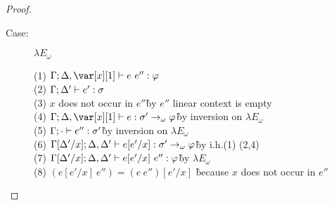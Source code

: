\begin{proof}
\begin{description}
\item[Case:] $\lambda E_\omega$
\begin{tabbing}
  (1) $\G; \D, \xl \vdash e~e'' : \vp$\\
  (2) $\Gamma; \Delta' \vdash e' : \sigma$\\
  (3) $x$ does not occur in $e''$\` by $e''$ linear context is empty\\
  (4) $\G; \D, \xl \vdash e : \s' \to_\omega \vp$\` by inversion on $\lambda E_\omega$\\
  (5) $\Gamma; \cdot \vdash e'' : \sigma'$\` by inversion on $\lambda E_\omega$\\
  (6) $\Gamma[\Delta'/x]; \Delta, \Delta' \vdash e[e'/x] : \sigma' \to_\omega \varphi$\` by i.h.(1) (2,4)\\
  (7) $\Gamma[\Delta'/x]; \Delta, \Delta' \vdash e[e'/x]~e'' : \varphi$\` by $\lambda E_\omega$\\
  (8) $(e[e'/x]~e'') = (e~e'')[e'/x]$ \` because $x$ does not occur in $e''$\\
\end{tabbing}


\end{description}
\end{proof}
